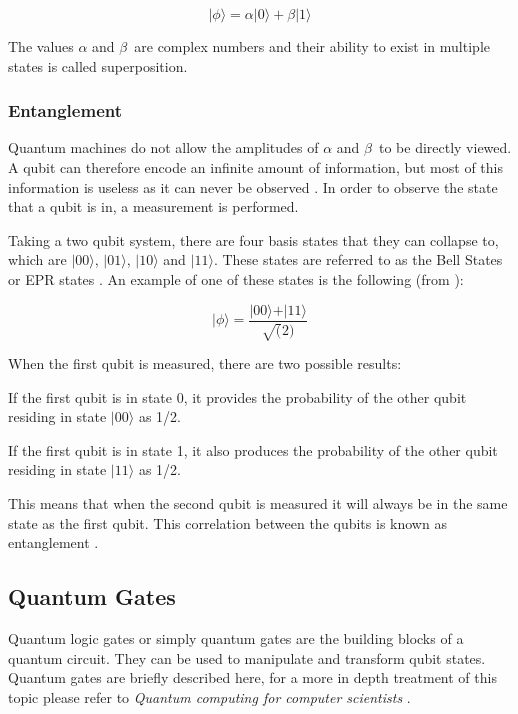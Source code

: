 \begin{displaymath}
\vert\phi\rangle = \alpha\vert0\rangle + \beta\vert 1\rangle  
\label{eq:s}
\end{displaymath}


The values $\alpha$ and $\beta$\ are complex numbers and their ability to exist in multiple states is called superposition.



\subsubsection*{Entanglement}

Quantum machines do not allow the amplitudes of $\alpha$ and $\beta$\ to be directly viewed. A qubit can therefore encode an infinite amount of information, but most of this information is useless as it can never be observed \citep{he2003}. 
In order to observe the state that a qubit is in, a measurement is performed. 


Taking a two qubit system, there are four basis states that they can collapse to, which are  $\vert00\rangle $,  $\vert01\rangle $, $\vert 10\rangle $ and $\vert 11\rangle $.
These states are referred to as the Bell States or EPR states \citep{he2003}. An example of one of these states is the following (from \cite{he2003}):

\begin{displaymath}
\vert\phi\rangle = \frac{\vert00\rangle + \vert 11\rangle }{\sqrt(2)}
\end{displaymath}

When the first qubit is measured, there are two possible results: 

If the first qubit is in state 0, it provides the probability of the other qubit residing in state $\vert00\rangle $ as 1/2.

If the first qubit is in state 1, it  also produces the probability of the other qubit residing in state $\vert 11\rangle $ as 1/2. 

This means that when the second qubit is measured it will always be in the same state as the first qubit. This correlation between the qubits is known as entanglement \citep{he2003}. 

\subsection{Quantum Gates}

Quantum logic gates or simply quantum gates are the building blocks of a quantum circuit. They can be used to manipulate and transform qubit states. 
Quantum gates are briefly described here, for a more in depth treatment of this topic please refer to \emph{Quantum computing for computer scientists} \citep{yanofsky2008quantum}.

